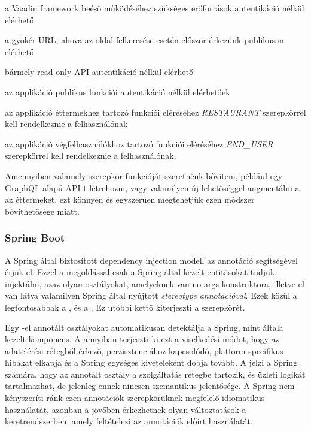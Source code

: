 \begin{listing}
	\item a Vaadin framework beéső működéséhez szükséges erőforrások autentikáció nélkül elérhető
	\item a gyökér URL, ahova az oldal felkeresése esetén először érkezünk publikusan elérhető
	\item bármely read-only API autentikáció nélkül elérhető
	\item az applikáció publikus funkciói autentikáció nélkül elérhetőek
	\item az applikáció éttermekhez tartozó funkciói eléréséhez \emph{RESTAURANT} szerepkörrel kell rendelkeznie a felhasználónak
	\item az applikáció végfelhasználókhoz tartozó funkciói eléréséhez \emph{END\_USER} szerepkörrel kell rendelkeznie a felhasználónak.
\end{listing} \par

Amennyiben valamely szerepkör funkcióját szeretnénk bővíteni, például egy GraphQL alapú API-t létrehozni, vagy valamilyen új lehetőséggel augmentálni a az éttermeket, ezt könnyen és egyszerűen megtehetjük ezen módszer bővíthetősége miatt. \par

\subsubsection{Spring Boot}

A Spring által biztosított dependency injection modell az  annotáció segítségével érjük el. Ezzel a megoldással csak a Spring által kezelt entitásokat tudjuk injektálni, azaz olyan osztályokat, amelyeknek van no-args-konstruktora, illetve el van látva valamilyen Spring által nyújtott \emph{stereotype annotációval}. Ezek közül a legfontosabbak a ,  és a . Ez utóbbi kettő kiterjeszti a  szerepkörét. \par

Egy -el annotált osztályokat automatikusan detektálja a Spring, mint általa kezelt komponens. A  annyiban terjeszti ki ezt a viselkedési módot, hogy az adatelérési rétegből érkező, perzisztenciához kapcsolódó, platform specifikus hibákat elkapja és a Spring egységes kivételeként dobja tovább. A  jelzi a Spring számára, hogy az annotált osztály a szolgáltatás rétegbe tartozik, és üzleti logikát tartalmazhat, de jelenleg ennek nincsen szemantikus jelentősége. A Spring nem kényszeríti ránk ezen annotációk szerepkörüknek megfelelő idiomatikus használatát, azonban a jövőben érkezhetnek olyan változtatások a keretrendszerben, amely feltételezi az annotációk előírt használatát. \par

